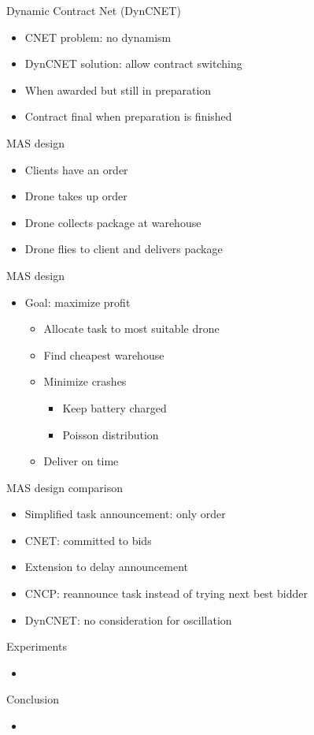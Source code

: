 \documentclass{beamer}
\begin{document}
	\begin{frame}{Dynamic Contract Net (DynCNET)}
		\begin{itemize}
			\item CNET problem: no dynamism
			\item DynCNET solution: allow contract switching
			\item When awarded but still in preparation
			\item Contract final when preparation is finished
		\end{itemize}
	\end{frame}
	
	\begin{frame}{MAS design}
		\begin{itemize}
			\item Clients have an order
			\item Drone takes up order
			\item Drone collects package at warehouse
			\item Drone flies to client and delivers package
		\end{itemize}
	\end{frame}
	
	\begin{frame}{MAS design}
		\begin{itemize}
			\item Goal: maximize profit
			\begin{itemize}
				\item Allocate task to most suitable drone
				\item Find cheapest warehouse
				\item Minimize crashes
				\begin{itemize}
					\item Keep battery charged
					\item Poisson distribution
				\end{itemize}
				\item Deliver on time
			\end{itemize}
		\end{itemize}
	\end{frame}
	
	\begin{frame}{MAS design comparison}
		\begin{itemize}
			\item Simplified task announcement: only order
			\item CNET: committed to bids
			\item Extension to delay announcement
			\item CNCP: reannounce task instead of trying next best bidder
			\item DynCNET: no consideration for oscillation
		\end{itemize}
	\end{frame}
	
	\begin{frame}{Experiments}
		\begin{itemize}
			\item
		\end{itemize}
	\end{frame}
	
	\begin{frame}{Conclusion}
		\begin{itemize}
			\item
		\end{itemize}
	\end{frame}
	
\end{document}
